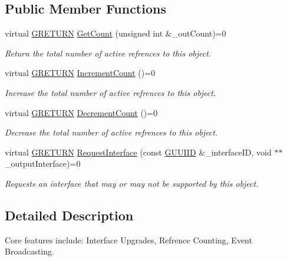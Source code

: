 \subsection*{Public Member Functions}
\begin{DoxyCompactItemize}
\item 
virtual \hyperlink{namespace_g_w_a69b1aaebac1cac8049825f035884c95b}{G\+R\+E\+T\+U\+RN} \hyperlink{class_g_w_1_1_c_o_r_e_1_1_g_interface_a80f212dcdf60202cf9da49405863d1d5}{Get\+Count} (unsigned int \&\+\_\+out\+Count)=0
\begin{DoxyCompactList}\small\item\em Return the total number of active refrences to this object. \end{DoxyCompactList}\item 
virtual \hyperlink{namespace_g_w_a69b1aaebac1cac8049825f035884c95b}{G\+R\+E\+T\+U\+RN} \hyperlink{class_g_w_1_1_c_o_r_e_1_1_g_interface_a3e04e58eef4f3e3f56ff7fb751194c37}{Increment\+Count} ()=0
\begin{DoxyCompactList}\small\item\em Increase the total number of active refrences to this object. \end{DoxyCompactList}\item 
virtual \hyperlink{namespace_g_w_a69b1aaebac1cac8049825f035884c95b}{G\+R\+E\+T\+U\+RN} \hyperlink{class_g_w_1_1_c_o_r_e_1_1_g_interface_af6924e12b14f217b518fc91c63d9703d}{Decrement\+Count} ()=0
\begin{DoxyCompactList}\small\item\em Decrease the total number of active refrences to this object. \end{DoxyCompactList}\item 
virtual \hyperlink{namespace_g_w_a69b1aaebac1cac8049825f035884c95b}{G\+R\+E\+T\+U\+RN} \hyperlink{class_g_w_1_1_c_o_r_e_1_1_g_interface_ab1414aa07bca310a824ee01a91657ad0}{Request\+Interface} (const \hyperlink{struct_g_w_1_1_g_u_u_i_i_d}{G\+U\+U\+I\+ID} \&\+\_\+interface\+ID, void $\ast$$\ast$\+\_\+output\+Interface)=0
\begin{DoxyCompactList}\small\item\em Requests an interface that may or may not be supported by this object. \end{DoxyCompactList}\end{DoxyCompactItemize}


\subsection{Detailed Description}
Core features include\+: Interface Upgrades, Refrence Counting, Event Broadcasting. 

